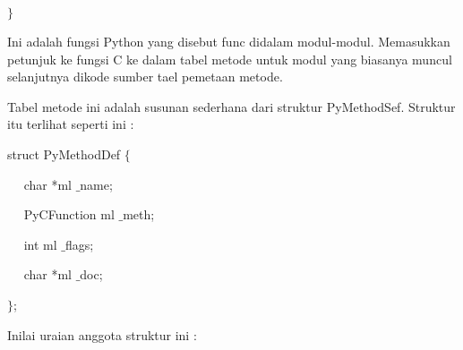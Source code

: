 \noindent 
 $  \}  $ \par
\vspace{12pt}
\vspace{12pt}
\noindent 
 \hspace*{0.5in} Ini adalah fungsi Python yang disebut func didalam modul-modul. Memasukkan petunjuk ke fungsi C ke dalam tabel metode untuk modul yang biasanya muncul selanjutnya dikode sumber tael pemetaan metode. \par
\noindent 
 \hspace*{0.5in} Tabel metode ini adalah susunan sederhana dari struktur PyMethodSef. Struktur itu terlihat seperti ini : \par
\noindent 
struct PyMethodDef  $  \{  $ \par
\noindent 
~~ char *ml $  \_  $name; \par
\noindent 
~~ PyCFunction ml $  \_  $meth; \par
\noindent 
~~ int ml $  \_  $flags; \par
\noindent 
~~ char *ml $  \_  $doc; \par
\noindent 
 $  \}  $; \par
\vspace{12pt}
\noindent 
Inilai uraian anggota struktur ini : \par
\noindent 
